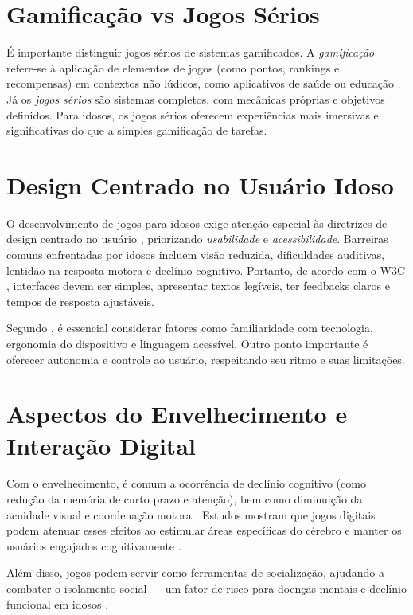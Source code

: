 \section{Gamificação vs Jogos Sérios}

É importante distinguir jogos sérios de sistemas gamificados. A \textit{gamificação} refere-se à aplicação de elementos de jogos (como pontos, rankings e recompensas) em contextos não lúdicos, como aplicativos de saúde ou educação \cite{deterding2011gamefulness}. Já os \textit{jogos sérios} são sistemas completos, com mecânicas próprias e objetivos definidos. Para idosos, os jogos sérios oferecem experiências mais imersivas e significativas do que a simples gamificação de tarefas.

\section{Design Centrado no Usuário Idoso}

O desenvolvimento de jogos para idosos exige atenção especial às diretrizes de design centrado no usuário \cite{abras2004user}, priorizando \textit{usabilidade} e \textit{acessibilidade}. Barreiras comuns enfrentadas por idosos incluem visão reduzida, dificuldades auditivas, lentidão na resposta motora e declínio cognitivo. Portanto, de acordo com o W3C \cite{w3c2024wcag}, interfaces devem ser simples, apresentar textos legíveis, ter feedbacks claros e tempos de resposta ajustáveis.

Segundo \cite{fisk2009designing}, é essencial considerar fatores como familiaridade com tecnologia, ergonomia do dispositivo e linguagem acessível. Outro ponto importante é oferecer autonomia e controle ao usuário, respeitando seu ritmo e suas limitações.

\section{Aspectos do Envelhecimento e Interação Digital}

Com o envelhecimento, é comum a ocorrência de declínio cognitivo (como redução da memória de curto prazo e atenção), bem como diminuição da acuidade visual e coordenação motora \cite{charness2009aging}. Estudos mostram que jogos digitais podem atenuar esses efeitos ao estimular áreas específicas do cérebro e manter os usuários engajados cognitivamente \cite{green2008plasticity}.

Além disso, jogos podem servir como ferramentas de socialização, ajudando a combater o isolamento social — um fator de risco para doenças mentais e declínio funcional em idosos \cite{cotten2012internet}.


